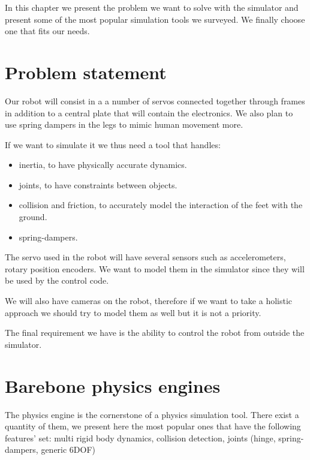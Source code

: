 In this chapter we present the problem we want to solve with the simulator and present some of the most popular simulation tools we surveyed. We finally choose one that fits our needs.

\section{Problem statement}
Our robot will consist in a a number of servos connected together through frames in addition to a central plate that will contain the electronics. We also plan to use spring dampers in the legs to mimic human movement more.

If we want to simulate it we thus need a tool that handles:\begin{itemize}
\item inertia, to have physically accurate dynamics.
\item joints, to have constraints between objects.
\item collision and friction, to accurately model the interaction of the feet with the ground.
\item spring-dampers.
\end{itemize}

The servo used in the robot will have several sensors such as accelerometers, rotary position encoders. We want to model them in the simulator since they will be used by the control code. 

We will also have cameras on the robot, therefore if we want to take a holistic approach we should try to model them as well but it is not a priority. 

The final requirement we have is the ability to control the robot from outside the simulator.

\section{Barebone physics engines}
The physics engine is the cornerstone of a physics simulation tool. There exist a quantity of them, we present here the most popular ones that have the following features' set:  multi rigid body dynamics, collision detection, joints (hinge, spring-dampers, generic 6DOF)

